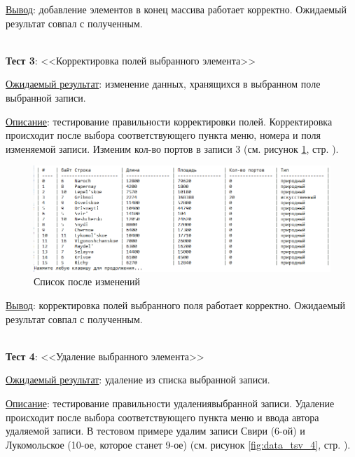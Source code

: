 \underline{Вывод}: добавление элементов в конец массива работает корректно. Ожидаемый результат совпал с полученным.

\hspace{0pt}\\



\textbf{Тест 3}: <<Корректировка полей выбранного элемента>>

\underline{Ожидаемый результат}: изменение данных, хранящихся в выбранном поле выбранной записи.

\underline{Описание}: тестирование правильности корректировки полей. Корректировка происходит после выбора соответствующего пункта меню, номера и поля изменяемой записи. Изменим кол-во портов в записи 3 (см. рисунок \ref{fig:data_tsv_3}, стр. \pageref{fig:data_tsv_3}).


\begin{figure}[!hp]
    \begin{center}
        \includegraphics[width=16cm]{../includes_PZ/tests/data-tsv-3.png}
    \end{center}
    \caption{Список после изменений\label{fig:data_tsv_3}}
\end{figure}

\underline{Вывод}: корректировка полей выбранного поля работает корректно. Ожидаемый результат совпал с полученным.

\hspace{0pt}\\



\textbf{Тест 4}: <<Удаление выбранного элемента>>

\underline{Ожидаемый результат}: удаление из списка выбранной записи.

\underline{Описание}: тестирование правильности удалениявыбранной записи. Удаление происходит после выбора соответствующего пункта меню и ввода автора удаляемой записи. В тестовом примере удалим записи Свири (6-ой) и Лукомольское (10-ое, которое станет 9-ое) (см. рисунок \ref{fig:data_tsv_4}, стр. \pageref{fig:data_tsv_4}).

